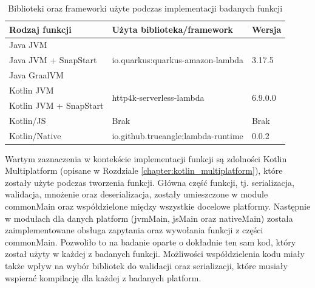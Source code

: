 \begin{table}[h!]
    \caption{Biblioteki oraz frameworki użyte podczas implementacji badanych funkcji}
    \centering
    \begin{tabular}{|l|l|l|}
    \hline
    \textbf{Rodzaj funkcji}           & \textbf{Użyta biblioteka/framework}                               & \textbf{Wersja} \\ \hline
    Java JVM                          & \multirow{3}{*}{io.quarkus:quarkus-amazon-lambda} & \multirow{3}{*}{3.17.5}   \\ \cline{1-1}
    Java JVM + SnapStart              &                                                  &                           \\ \cline{1-1}
    Java GraalVM                      &                                                  &                           \\ \hline
    Kotlin JVM                        & \multirow{2}{*}{http4k-serverless-lambda}         & \multirow{2}{*}{6.9.0.0}  \\ \cline{1-1}
    Kotlin JVM + SnapStart            &                                                  &                           \\ \hline
    Kotlin/JS                         & Brak                                             & Brak                      \\ \hline
    Kotlin/Native                     & io.github.trueangle:lambda-runtime               & 0.0.2                     \\ \hline
    \end{tabular}
    \label{table:lambda_tools_versions}
\end{table}

Wartym zaznaczenia w kontekście implementacji funkcji są zdolności Kotlin Multiplatform (opisane w Rozdziale \ref{chapter:kotlin_multiplatform}), które zostały użyte podczas tworzenia funkcji.
Główna część funkcji, tj. serializacja, walidacja, mnożenie oraz deserializacja, zostały umieszczone w module commonMain oraz współdzielone między wszystkie docelowe platformy.
Następnie w modułach dla danych platform (jvmMain, jsMain oraz nativeMain) została zaimplementowane obsługa zapytania oraz wywołania funkcji z części commonMain.
Pozwoliło to na badanie oparte o dokładnie ten sam kod, który został użyty w każdej z badanych funkcji.
Możliwości współdzielenia kodu miały także wpływ na wybór bibliotek do walidacji oraz serializacji, które musiały wspierać kompilację dla każdej z badanych platform.

